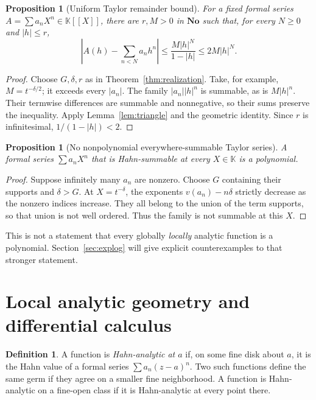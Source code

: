 \documentclass[11pt,a4paper]{article}
\numberwithin{equation}{section}
\newtheorem{proposition}[theorem]{Proposition}
\theoremstyle{definition}
\newtheorem{definition}[theorem]{Definition}
\theoremstyle{remark}
\newcommand{\No}{\mathbf{No}}
\newcommand{\K}{\mathbb K}
\begin{document}
\begin{proposition}[Uniform Taylor remainder bound]
\label{prop:remainder}
For a fixed formal series $A=\sum a_nX^n\in\K[[X]]$, there are $r,M>0$ in $\No$ such that, for every $N\geq0$ and $|h|\leq r$,
\[
 \left|A(h)-\sum_{n<N}a_nh^n\right|
 \leq \frac{M|h|^N}{1-|h|}\leq2M|h|^N.
\]
\end{proposition}
\begin{proof}
Choose $G,\delta,r$ as in Theorem~\ref{thm:realization}. Take, for example, $M=t^{-\delta/2}$; it exceeds every $|a_n|$. The family $|a_n||h|^n$ is summable, as is $M|h|^n$. Their termwise differences are summable and nonnegative, so their sums preserve the inequality. Apply Lemma~\ref{lem:triangle} and the geometric identity. Since $r$ is infinitesimal, $1/(1-|h|)<2$.
\end{proof}

\begin{proposition}[No nonpolynomial everywhere-summable Taylor series]
\label{prop:globalseries}
A formal series $\sum a_nX^n$ that is Hahn-summable at every $X\in\K$ is a polynomial.
\end{proposition}
\begin{proof}
Suppose infinitely many $a_n$ are nonzero. Choose $G$ containing their supports and $\delta>G$. At $X=t^{-\delta}$, the exponents $v(a_n)-n\delta$ strictly decrease as the nonzero indices increase. They all belong to the union of the term supports, so that union is not well ordered. Thus the family is not summable at this $X$.
\end{proof}
This is not a statement that every globally \emph{locally} analytic function is a polynomial. Section~\ref{sec:explog} will give explicit counterexamples to that stronger statement.

\section{Local analytic geometry and differential calculus}
\label{sec:local}
\begin{definition}
A function is \emph{Hahn-analytic at $a$} if, on some fine disk about $a$, it is the Hahn value of a formal series $\sum a_n(z-a)^n$. Two such functions define the same germ if they agree on a smaller fine neighborhood. A function is Hahn-analytic on a fine-open class if it is Hahn-analytic at every point there.
\end{definition}
\end{document}

